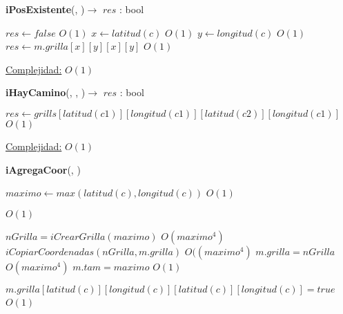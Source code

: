 \begin{Algoritmos}

\begin{algorithm}[H]
{\textbf{iPosExistente}(, )$\to$ $res$ : bool}
\begin{algorithmic}[1]
   

	\State $res \gets false$ \Comment $O(1)$
\Else
	\State $x \gets latitud(c)$ \Comment $O(1)$
	\State $y \gets longitud(c)$ \Comment $O(1)$
	\State $res \gets m.grilla[x][y][x][y]$ \Comment $O(1)$
\EndIf


\medskip
\Statex \underline{Complejidad:} $O(1)$


\end{algorithmic}
\end{algorithm}


\begin{algorithm}[H]
{\textbf{iHayCamino}(, , )$\to$ $res$ : bool}
\begin{algorithmic}[1]

\State $res \gets grills[latitud(c1)][longitud(c1)][latitud(c2)][longitud(c1)]$ \Comment $O(1)$

\medskip
\Statex \underline{Complejidad:} $O(1)$


\end{algorithmic}
\end{algorithm}




{\textbf{iAgregaCoor}(, )}
\begin{algorithmic}[1]

\State $maximo \gets max(latitud(c), longitud(c)) $ \Comment $O(1)$

\State {} \Comment $O(1)$

\State $nGrilla = iCrearGrilla(maximo)$ \Comment $O(maximo^4)$
\State $iCopiarCoordenadas(nGrilla, m.grilla)$ \Comment $O((maximo^4)$
\State $m.grilla = nGrilla$ \Comment $O(maximo^4)$
\State $m.tam = maximo$ \Comment $O(1)$

\EndIf

\State $m.grilla[latitud(c)][longitud(c)][latitud(c)][longitud(c)] = true$ \Comment $O(1)$
\State $ $


\end{algorithmic}
\end{Algoritmos}
